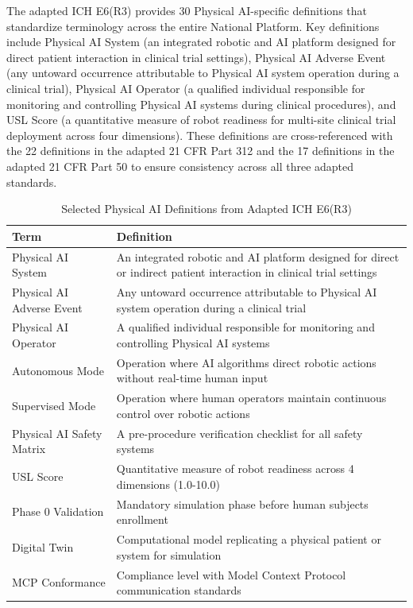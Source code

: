The adapted ICH E6(R3) provides 30 Physical AI-specific definitions that
standardize terminology across the entire National Platform. Key definitions
include Physical AI System (an integrated robotic and AI platform designed for
direct patient interaction in clinical trial settings), Physical AI Adverse
Event (any untoward occurrence attributable to Physical AI system operation
during a clinical trial), Physical AI Operator (a qualified individual
responsible for monitoring and controlling Physical AI systems during clinical
procedures), and USL Score (a quantitative measure of robot readiness for
multi-site clinical trial deployment across four dimensions). These definitions
are cross-referenced with the 22 definitions in the adapted 21 CFR Part 312
\cite{cfr312-adapt} and the 17 definitions in the adapted 21 CFR Part 50
\cite{cfr50-adapt} to ensure consistency across all three adapted standards.

\begin{table}[H]
\centering
\caption{Selected Physical AI Definitions from Adapted ICH E6(R3)}
\label{tab:ich-definitions}
\small
\begin{tabularx}{\textwidth}{l X}
\toprule
\textbf{Term} & \textbf{Definition} \\
\midrule
Physical AI System & An integrated robotic and AI platform designed for direct or indirect patient interaction in clinical trial settings \\
Physical AI Adverse Event & Any untoward occurrence attributable to Physical AI system operation during a clinical trial \\
Physical AI Operator & A qualified individual responsible for monitoring and controlling Physical AI systems \\
Autonomous Mode & Operation where AI algorithms direct robotic actions without real-time human input \\
Supervised Mode & Operation where human operators maintain continuous control over robotic actions \\
Physical AI Safety Matrix & A pre-procedure verification checklist for all safety systems \\
USL Score & Quantitative measure of robot readiness across 4 dimensions (1.0-10.0) \\
Phase 0 Validation & Mandatory simulation phase before human subjects enrollment \\
Digital Twin & Computational model replicating a physical patient or system for simulation \\
MCP Conformance & Compliance level with Model Context Protocol communication standards \\
\bottomrule
\end{tabularx}
\end{table}

